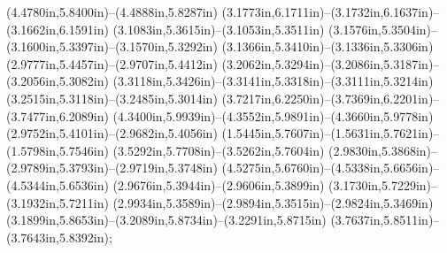(4.4780in,5.8400in)--(4.4888in,5.8287in) (3.1773in,6.1711in)--(3.1732in,6.1637in)--(3.1662in,6.1591in) (3.1083in,5.3615in)--(3.1053in,5.3511in) (3.1576in,5.3504in)--(3.1600in,5.3397in)--(3.1570in,5.3292in) (3.1366in,5.3410in)--(3.1336in,5.3306in) (2.9777in,5.4457in)--(2.9707in,5.4412in) (3.2062in,5.3294in)--(3.2086in,5.3187in)--(3.2056in,5.3082in) (3.3118in,5.3426in)--(3.3141in,5.3318in)--(3.3111in,5.3214in) (3.2515in,5.3118in)--(3.2485in,5.3014in) (3.7217in,6.2250in)--(3.7369in,6.2201in)--(3.7477in,6.2089in) (4.3400in,5.9939in)--(4.3552in,5.9891in)--(4.3660in,5.9778in) (2.9752in,5.4101in)--(2.9682in,5.4056in) (1.5445in,5.7607in)--(1.5631in,5.7621in)--(1.5798in,5.7546in) (3.5292in,5.7708in)--(3.5262in,5.7604in) (2.9830in,5.3868in)--(2.9789in,5.3793in)--(2.9719in,5.3748in) (4.5275in,5.6760in)--(4.5338in,5.6656in)--(4.5344in,5.6536in) (2.9676in,5.3944in)--(2.9606in,5.3899in) (3.1730in,5.7229in)--(3.1932in,5.7211in) (2.9934in,5.3589in)--(2.9894in,5.3515in)--(2.9824in,5.3469in) (3.1899in,5.8653in)--(3.2089in,5.8734in)--(3.2291in,5.8715in) (3.7637in,5.8511in)--(3.7643in,5.8392in);
